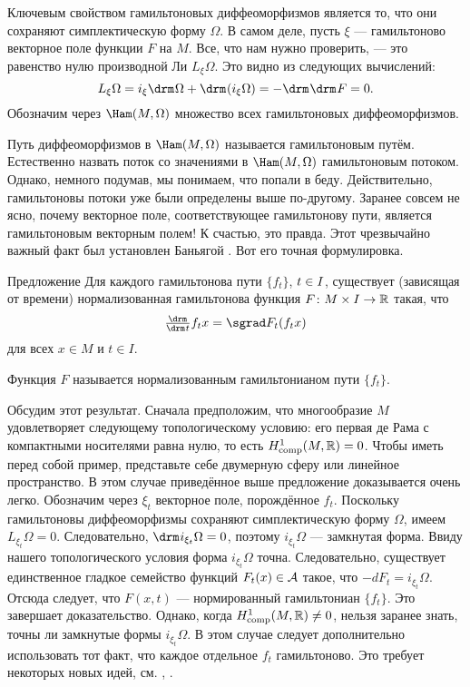 Ключевым свойством гамильтоновых диффеоморфизмов является то, что они сохраняют симплектическую форму $\Omega$.
В самом деле, пусть $\xi$ --- гамильтоново векторное поле функции $F$ на $M$.
Все, что нам нужно проверить, --- это равенство нулю производной Ли $L_\xi \Omega$.
Это видно из следующих вычислений: 
\[L_\xi \Omega = i_\xi \d\Omega + \d (i_\xi \Omega) = -\d\d F = 0.\]
Обозначим через $\Ham (M, \Omega)$ множество всех гамильтоновых диффеоморфизмов.

Путь диффеоморфизмов в $\Ham (M, \Omega)$ называется гамильтоновым путём.
Естественно назвать поток со значениями в $\Ham (M, \Omega)$ гамильтоновым потоком.
Однако, немного подумав, мы понимаем, что попали в беду.
Действительно, гамильтоновы потоки уже были определены выше по-другому.
Заранее совсем не ясно, почему векторное поле, соответствующее гамильтонову пути, является гамильтоновым векторным полем!
К счастью, это правда.
Этот чрезвычайно важный факт был установлен Баньягой \cite{B1}.
Вот его точная формулировка.

\begin{thm}{Предложение}\label{1.4.B}
Для каждого гамильтонова пути $\{f_t\}$, $t \z\in I$, существует (зависящая от времени) нормализованная гамильтонова функция $F\colon M \times I \to \mathbb{R}$ такая, что 
\[\tfrac \d{\d t} f_t x = \sgrad F_t (f_t x)\]
для всех $x \in M$ и $t \in I$.
\end{thm}

Функция $F$ называется нормализованным гамильтонианом
пути $\{f_t\}$.

Обсудим этот результат.
Сначала предположим, что многообразие $M$ удовлетворяет следующему
топологическому условию: его первая  де Рама с компактными носителями равна нулю, то есть $H_{\mathrm{comp}}^1 (M, \mathbb{R}) = 0$.
Чтобы иметь перед собой пример, представьте себе двумерную сферу или линейное пространство.
В этом случае приведённое выше предложение доказывается очень легко.
Обозначим через $\xi_t$ векторное поле, порождённое $f_t$.
Поскольку гамильтоновы диффеоморфизмы сохраняют симплектическую форму $\Omega$, имеем $L_{\xi_t} \Omega = 0$.
Следовательно, $\d i_{\xi_t} \Omega = 0$, поэтому $i_{\xi_t} \Omega$ --- замкнутая форма.
Ввиду нашего топологического условия форма $i_{\xi_t} \Omega$ точна.
Следовательно, существует единственное гладкое семейство функций $F_t (x) \in \mathcal{A}$ такое, что $-dF_t = i_{\xi_t} \Omega$.
Отсюда следует, что $F (x, t)$ --- нормированный гамильтониан $\{f_t\}$.
Это завершает доказательство.
Однако, когда $H^1_{\mathrm{comp}} (M, \mathbb{R}) \ne 0$, нельзя  заранее знать, точны ли замкнутые формы $i_{\xi_t} \Omega$.
В этом случае следует дополнительно использовать тот факт, что каждое отдельное $f_t$ гамильтоново.
Это требует некоторых новых идей, см. \cite{B1}, \cite{MS}.

